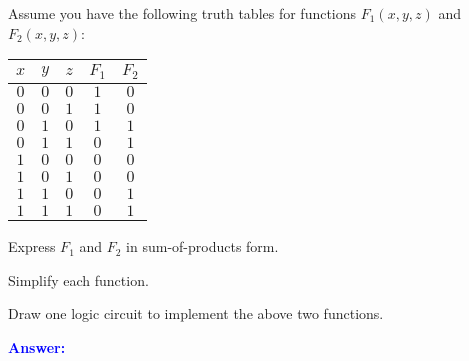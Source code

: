\item{}
Assume you have the following truth tables for functions $F_1(x,y,z)$ and
$F_2(x,y,z)$:\\[6pt]
\begin{tabular}{ccc|cc}
    \hline
    {\bf $x$} & {\bf $y$} & {\bf $z$} & {\bf $F_1$} & {\bf $F_2$} \\ \hline\hline
    $0$ & $0$ & $0$ & $1$ & $0$ \\ \hline
    $0$ & $0$ & $1$ & $1$ & $0$ \\ \hline
    $0$ & $1$ & $0$ & $1$ & $1$ \\ \hline
    $0$ & $1$ & $1$ & $0$ & $1$ \\ \hline
    $1$ & $0$ & $0$ & $0$ & $0$ \\ \hline
    $1$ & $0$ & $1$ & $0$ & $0$ \\ \hline
    $1$ & $1$ & $0$ & $0$ & $1$ \\ \hline
    $1$ & $1$ & $1$ & $0$ & $1$ \\ \hline
\end{tabular}
\begin{list}{\textbf{}}{}
    \item Express $F_1$ and $F_2$ in sum-of-products form.
    \item Simplify each function.
    \item Draw one logic circuit to implement the above two functions.
\end{list}
\vskip12pt
\ifanswers
\textcolor{blue}{
\textbf{Answer:}\\
\begin{list}{\textbf{}}{}
\item 
\end{list}
}
\newpage
\fi

